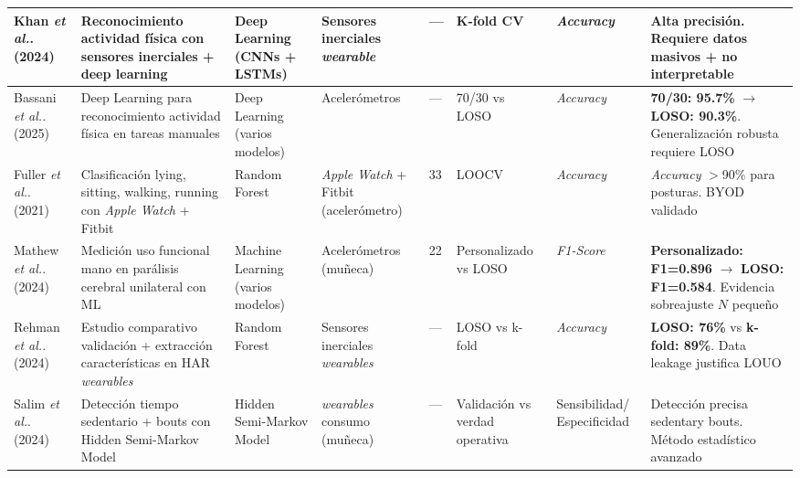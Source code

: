 \begin{landscape}
\begin{longtable}{@{}p{1.8cm}p{2.5cm}p{1.8cm}p{1.5cm}p{0.9cm}p{1.3cm}p{2.0cm}p{1.8cm}@{}}
\midrule


Khan \textit{et al.}. (2024) \cite{Khan2024Wearable} & 
Reconocimiento actividad física con sensores inerciales + deep learning & 
Deep Learning (CNNs + LSTMs) & 
Sensores inerciales \textit{wearable} & 
--- & 
K-fold CV & 
\textit{Accuracy} & 
Alta precisión. Requiere datos masivos + no interpretable \\

\midrule

Bassani \textit{et al.}. (2025) \cite{Bassani2025DLHAR} & 
Deep Learning para reconocimiento actividad física en tareas manuales & 
Deep Learning (varios modelos) & 
Acelerómetros & 
--- & 
70/30 vs LOSO & 
\textit{Accuracy} & 
\textbf{70/30: 95.7\%} $\rightarrow$ \textbf{LOSO: 90.3\%}. Generalización robusta requiere LOSO \\

\midrule


Fuller \textit{et al.}. (2021) \cite{Fuller2021Predicting} & 
Clasificación lying, sitting, walking, running con \textit{Apple Watch} + Fitbit & 
Random Forest & 
\textit{Apple Watch} + Fitbit (acelerómetro) & 
33 & 
LOOCV & 
\textit{Accuracy} & 
\textit{Accuracy} $>$90\% para posturas. BYOD validado \\

\midrule

Mathew \textit{et al.}. (2024) \cite{Mathew2024LOSO} & 
Medición uso funcional mano en parálisis cerebral unilateral con ML & 
Machine Learning (varios modelos) & 
Acelerómetros (muñeca) & 
22 & 
Personalizado vs LOSO & 
\textit{F1-Score} & 
\textbf{Personalizado: F1=0.896} $\rightarrow$ \textbf{LOSO: F1=0.584}. Evidencia sobreajuste $N$ pequeño \\

\midrule

Rehman \textit{et al.}. (2024) \cite{Rehman2024LOSO} & 
Estudio comparativo validación + extracción características en HAR \textit{wearables} & 
Random Forest & 
Sensores inerciales \textit{wearables} & 
--- & 
LOSO vs k-fold & 
\textit{Accuracy} & 
\textbf{LOSO: 76\%} vs \textbf{k-fold: 89\%}. Data leakage justifica LOUO \\

\midrule


Salim \textit{et al.}. (2024) \cite{Salim2024STEPHEN} & 
Detección tiempo sedentario + bouts con Hidden Semi-Markov Model & 
Hidden Semi-Markov Model & 
\textit{wearables} consumo (muñeca) & 
--- & 
Validación vs verdad operativa & 
Sensibilidad/ Especificidad & 
Detección precisa sedentary bouts. Método estadístico avanzado \\


\end{longtable}
\end{landscape}
